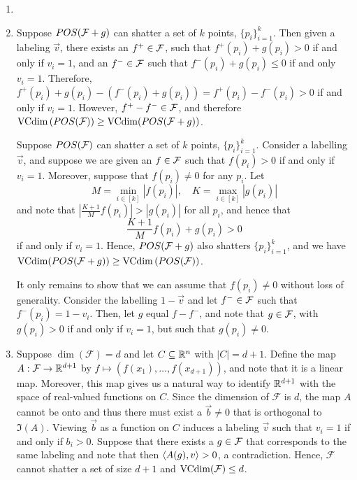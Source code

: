 \begin{ex}
  \begin{enumerate}
    \item[]
    \item Suppose $POS(\mathcal{F}+g)$ can shatter a set of $k$ points,
          $\{p_i\}_{i=1}^k$. Then given a labeling $\vec{v}$, there exists an
          $f^+\in \mathcal{F}$, such that $f^+(p_i)+g(p_i)>0$ if and only if $v_i=1$,
          and an $f^-\in \mathcal{F}$ such that $f^-(p_i)+g(p_i)\leq 0$ if and only
          $v_i=1$. Therefore,
          $f^+(p_i)+g(p_i)-(f^-(p_i)+g(p_i))=f^+(p_i)-f^-(p_i)>0$
          if and only if $v_i=1$. However, $f^+-f^-\in \mathcal{F}$, and therefore
          $\operatorname{VCdim}{(POS(\mathcal{F}))}\geq \operatorname{VCdim}(POS(\mathcal{F}+g))$.

          Suppose $POS(\mathcal{F})$ can shatter a set of $k$ points, $\{p_i\}_{i=1}^k$.
          Consider a labelling $\vec{v}$, and suppose we are given an $f\in \mathcal{F}$
          such that $f(p_i)>0$ if and only if $v_i=1$. Moreover, suppose that
          $f(p_i)\neq 0$ for any $p_i$. Let
          \[
            M=\min_{i\in [k]} |f(p_i)|,\quad K=\max_{i\in [k]} |g(p_i)|
          \]
          and note that $|\frac{K+1}{M}f(p_i)|>|g(p_i)|$ for all $p_i$,
          and hence that
          \[
            \frac{K+1}{M}f(p_i)+g(p_i) > 0
          \]
          if and only if $v_i=1$. Hence, $POS(\mathcal{F}+g)$ also shatters
          $\{p_i\}_{i=1}^k$, and we have
          $\operatorname{VCdim}(POS(\mathcal{F}+g))\geq \operatorname{VCdim}{(POS(\mathcal{F}))}$.

          It only remains to show that we can assume that $f(p_i)\neq 0$
          without loss of generality. Consider the labelling $1-\vec{v}$ and let
          $f^-\in \mathcal{F}$ such that $f^-(p_i)=1-v_i$. Then, let $g$ equal $f-f^-$,
          and note that $g\in \mathcal{F}$, with $g(p_i)>0$ if and only if $v_i=1$,
          but such that $g(p_i)\neq 0$.
    \item Suppose $\dim(\mathcal{F})=d$ and let $C\subseteq \mathbb{R}^{n}$
          with $|C|=d+1$. Define the map $A:\mathcal{F}\to\mathbb{R}^{d+1}$ by
          $f\mapsto (f(x_1),\ldots,f(x_{d+1}))$, and note that it is a linear
          map. Moreover, this map gives us a natural way to identify $\mathbb{R}^{d+1}$
          with the space of real-valued functions on $C$. Since the
          dimension of $\mathcal{F}$ is $d$, the map $A$ cannot be onto and
          thus there must exist a $\vec{b}\neq 0$ that is orthogonal to
          $\Im(A)$. Viewing $\vec{b}$ as a function on $C$ induces a labeling
          $\vec{v}$ such that $v_i=1$ if and only if $b_i>0$. Suppose that
          there exists a $g\in\mathcal{\mathcal{F}}$ that corresponds to the same
          labeling and note that then $\left\langle A(g), v \right\rangle > 0$, a contradiction.
          Hence, $\mathcal{F}$ cannot shatter a set of size $d+1$ and
          $\operatorname{VCdim}(\mathcal{F}) \leq d$.


\end{enumerate}
\end{ex}
